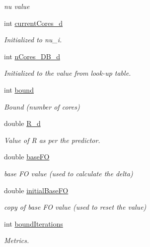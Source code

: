 \begin{DoxyCompactItemize}
\begin{DoxyCompactList}\small\item\em nu value \end{DoxyCompactList}\item 
int \hyperlink{classApplication_adee341a84a5389dfd4d16e7f8e697190}{current\-Cores\-\_\-d}
\begin{DoxyCompactList}\small\item\em Initialized to nu\-\_\-i. \end{DoxyCompactList}\item 
int \hyperlink{classApplication_a95104d330c9c7ed2c1017b4938a39a9a}{n\-Cores\-\_\-\-D\-B\-\_\-d}
\begin{DoxyCompactList}\small\item\em Initialized to the value from look-\/up table. \end{DoxyCompactList}\item 
int \hyperlink{classApplication_a6e91bef9d503af0e8ba38c8f445c8cb0}{bound}
\begin{DoxyCompactList}\small\item\em Bound (number of cores) \end{DoxyCompactList}\item 
double \hyperlink{classApplication_a374d43f68ae27aaed98278e8152a434c}{R\-\_\-d}
\begin{DoxyCompactList}\small\item\em Value of R as per the predictor. \end{DoxyCompactList}\item 
double \hyperlink{classApplication_aa703e7525d446d98b5cd51c959d35998}{base\-F\-O}
\begin{DoxyCompactList}\small\item\em base F\-O value (used to calculate the delta) \end{DoxyCompactList}\item 
double \hyperlink{classApplication_a95fd54cbed658fb23ce27939666c91d2}{initial\-Base\-F\-O}
\begin{DoxyCompactList}\small\item\em copy of base F\-O value (used to reset the value) \end{DoxyCompactList}\item 
int \hyperlink{classApplication_a6a3692743eccba602a58fdfc3f23950b}{bound\-Iterations}
\begin{DoxyCompactList}\small\item\em Metrics. \end{DoxyCompactList}\item 

\end{DoxyCompactItemize}
